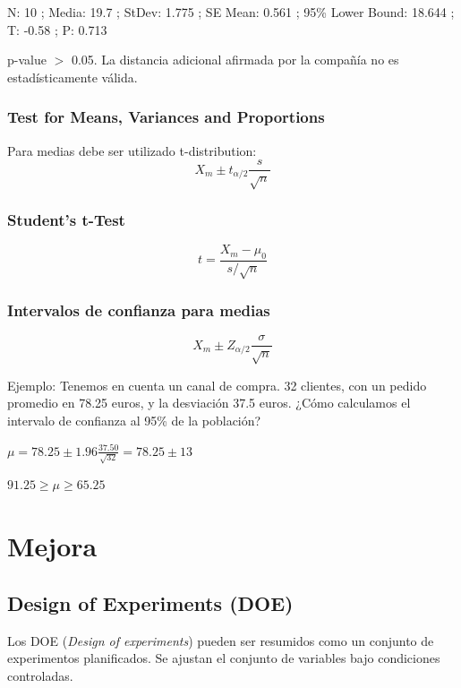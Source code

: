 \documentclass[oneside]{book}
\begin{document}
N: 10 ; Media: 19.7 ; StDev: 1.775 ; SE Mean: 0.561 ; 95\% Lower Bound: 18.644 ; T: -0.58 ; P: 0.713 

p-value $>$ 0.05. La distancia adicional afirmada por la compañía no es estadísticamente válida.

\section{Test for Means, Variances and Proportions}

Para medias debe ser utilizado t-distribution:
\begin{equation}
X_m \pm t_{\alpha/2}\frac{s}{\sqrt{n}}
\end{equation}

\section{Student's t-Test}
\begin{equation}
t = \frac{X_m-\mu_0}{s/\sqrt{n}}
\end{equation}

\section{Intervalos de confianza para medias}
\begin{equation}
X_m \pm Z_{\alpha/2} \frac{\sigma}{\sqrt{n}}
\end{equation}

Ejemplo: Tenemos en cuenta un canal de compra. 32 clientes, con un pedido promedio en 78.25 euros, y la desviación 37.5 euros. ¿Cómo calculamos el intervalo de confianza al 95\% de la población? \newline
\begin{center}$\mu = 78.25 \pm 1.96\frac{37.50}{\sqrt{32}} = 78.25 \pm 13$ \end{center} 
\begin{center}$91.25 \geq \mu \geq 65.25 $ \end{center}
\part{Mejora}
\chapter{Design of Experiments (DOE)}

Los DOE (\textit{Design of experiments}) pueden ser resumidos como un conjunto de experimentos planificados. Se ajustan el conjunto de variables bajo condiciones controladas.
\end{document}
